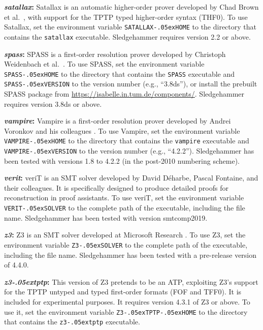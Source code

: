 \documentclass[a4paper,12pt]{article}
\newcommand\download{\url{https://isabelle.in.tum.de/components/}}
\renewcommand\_{\hbox{\textunderscore\kern-.05ex}}
\begin{document}
\begin{enum}
\begin{sloppy}
\begin{enum}
\item[\labelitemi] \textbf{\textit{satallax}:} Satallax is an automatic
higher-order prover developed by Chad Brown et al.\ \cite{satallax}, with
support for the TPTP typed higher-order syntax (THF0). To use Satallax, set the
environment variable \texttt{SATALLAX\_HOME} to the directory that contains the
\texttt{satallax} executable. Sledgehammer requires version 2.2 or above.

\item[\labelitemi] \textbf{\textit{spass}:} SPASS is a first-order resolution
prover developed by Christoph Weidenbach et al.\ \cite{weidenbach-et-al-2009}.
To use SPASS, set the environment variable \texttt{SPASS\_HOME} to the directory
that contains the \texttt{SPASS} executable and \texttt{SPASS\_VERSION} to the
version number (e.g., ``3.8ds''), or install the prebuilt SPASS package from
\download. Sledgehammer requires version 3.8ds or above.

\item[\labelitemi] \textbf{\textit{vampire}:} Vampire is a first-order
resolution prover developed by Andrei Voronkov and his colleagues
\cite{riazanov-voronkov-2002}. To use Vampire, set the environment variable
\texttt{VAMPIRE\_HOME} to the directory that contains the \texttt{vampire}
executable and \texttt{VAMPIRE\_VERSION} to the version number (e.g.,
``4.2.2''). Sledgehammer has been tested with versions 1.8 to 4.2.2 (in the
post-2010 numbering scheme).

\item[\labelitemi] \textbf{\textit{verit}:} veriT \cite{bouton-et-al-2009} is an
SMT solver developed by David D\'eharbe, Pascal Fontaine, and their colleagues.
It is specifically designed to produce detailed proofs for reconstruction in
proof assistants. To use veriT, set the environment variable
\texttt{VERIT\_SOLVER} to the complete path of the executable, including the
file name. Sledgehammer has been tested with version smtcomp2019.

\item[\labelitemi] \textbf{\textit{z3}:} Z3 is an SMT solver developed at
Microsoft Research \cite{z3}. To use Z3, set the environment variable
\texttt{Z3\_SOLVER} to the complete path of the executable, including the
file name. Sledgehammer has been tested with a pre-release version of 4.4.0.

\item[\labelitemi] \textbf{\textit{z3\_tptp}:} This version of Z3 pretends to be
an ATP, exploiting Z3's support for the TPTP untyped and typed first-order
formats (FOF and TFF0). It is included for experimental purposes. It requires
version 4.3.1 of Z3 or above. To use it, set the environment variable
\texttt{Z3\_TPTP\_HOME} to the directory that contains the \texttt{z3\_tptp}
executable.


\end{enum}
\end{sloppy}
\end{enum}
\end{document}
